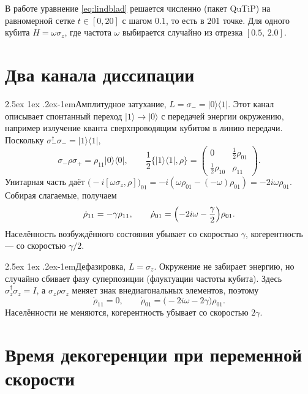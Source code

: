 \documentclass[12pt,a4paper]{report}
\makeatletter
\renewcommand\paragraph{\@startsection{paragraph}{4}{\z@}%
  {2.5ex \@plus1ex \@minus.2ex}{-1em}{\normalfont\normalsize\bfseries}}
\numberwithin{equation}{chapter}
\newcommand{\ket}[1]{|#1\rangle}
\newcommand{\bra}[1]{\langle #1|}
\makeatother
\begin{document}
В работе уравнение \eqref{eq:lindblad} решается численно (пакет QuTiP) на
равномерной сетке $t\in[0,20]$ с шагом $0.1$, то есть в 201 точке. Для одного
кубита $H=\omega\sigma_z$, где частота $\omega$ выбирается случайно из
отрезка $[0.5,\,2.0]$.

\section{Два канала диссипации}
\label{sec:channels}

\paragraph{Амплитудное затухание, $L=\sigma_-=\ket0\bra1$.} Этот канал
описывает спонтанный переход $\ket1\to\ket0$ с передачей энергии окружению,
например излучение кванта сверхпроводящим кубитом в линию передачи.
Поскольку $\sigma_-^\dagger\sigma_-=\ket1\bra1$,
\[
\sigma_-\rho\sigma_+=\rho_{11}\ket0\bra0,\qquad
\frac12\{\ket1\bra1,\rho\}=
\begin{pmatrix}0&\tfrac12\rho_{01}\\ \tfrac12\rho_{10}&\rho_{11}\end{pmatrix}.
\]
Унитарная часть даёт $\bigl(-i[\omega\sigma_z,\rho]\bigr)_{01}
=-i(\omega\rho_{01}-(-\omega)\rho_{01})=-2i\omega\rho_{01}$. Собирая
слагаемые, получаем
\begin{equation}
\dot\rho_{11}=-\gamma\rho_{11},\qquad
\dot\rho_{01}=\Bigl(-2i\omega-\frac\gamma2\Bigr)\rho_{01}.
\end{equation}
Населённость возбуждённого состояния убывает со скоростью $\gamma$,
когерентность --- со скоростью $\gamma/2$.

\paragraph{Дефазировка, $L=\sigma_z$.} Окружение не забирает энергию, но
случайно сбивает фазу суперпозиции (флуктуации частоты кубита). Здесь
$\sigma_z^\dagger\sigma_z=I$, а $\sigma_z\rho\sigma_z$ меняет знак
внедиагональных элементов, поэтому
\begin{equation}
\dot\rho_{11}=0,\qquad
\dot\rho_{01}=\bigl(-2i\omega-2\gamma\bigr)\rho_{01}.
\end{equation}
Населённости не меняются, когерентность убывает со скоростью $2\gamma$.

\section{Время декогеренции при переменной скорости}
\label{sec:t2one}
\end{document}
